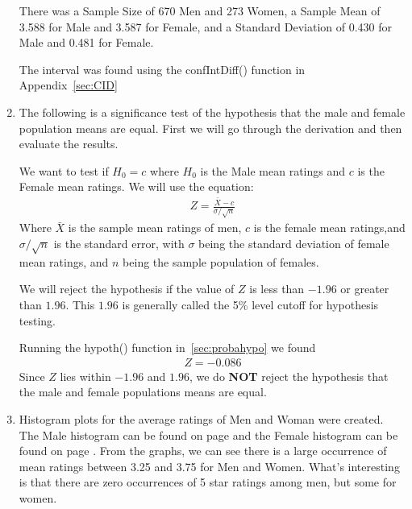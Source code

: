 \documentclass[11pt]{article}  %
\begin{document}
\begin{enumerate}
    There was a Sample Size of 670 Men and 273 Women, a Sample Mean of 3.588 for Male and 3.587 for Female, and a Standard Deviation of 0.430 for Male and 0.481 for Female.
    
    The interval was found using the confIntDiff() function in Appendix~\ref{sec:CID}
    
    \item The following is a significance test of the hypothesis that the male and female population means are equal. First we will go through the derivation and then evaluate the results.
    
    We want to test if $H_0 = c$ where $H_0$ is the Male mean ratings and $c$ is the Female mean ratings. We will use the equation:
    \begin{align*}
        Z = \frac{\bar{X} - c}{\sigma / \sqrt{n}}
    \end{align*}
    Where $\bar{X}$ is the sample mean ratings of men, $c$ is the female mean ratings,and $\sigma / \sqrt{n}$ is the standard error, with $\sigma$ being the standard deviation of female mean ratings, and $n$ being the sample population of females.

    We will reject the hypothesis if the value of $Z$ is less than $-1.96$ or greater than $1.96$. This $1.96$ is generally called the 5\% level cutoff for hypothesis testing.
    
    Running the hypoth() function in~\ref{sec:probahypo} we found
    \begin{align*}
        Z = -0.086
    \end{align*}
    Since $Z$ lies within $-1.96$ and $1.96$, we do \textbf{NOT} reject the hypothesis that the male and female populations means are equal.


    \item Histogram plots for the average ratings of Men and Woman were created. The Male histogram can be found on page \pageref{fig:menhist} and the Female histogram can be found on page \pageref{fig:femalehist}. From the graphs, we can see there is a large occurrence of mean ratings between 3.25 and 3.75  for Men and Women. What's interesting is that there are zero occurrences of 5 star ratings among men, but some for women.
    

\end{enumerate}
\end{document}
